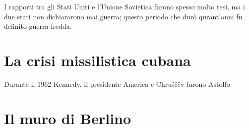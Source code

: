 I rapporti tra gli Stati Uniti e l'Unione Sovietica furono spesso molto tesi, ma i due stati non dichiararono mai guerra; questo periodo che durò qurant'anni fu definito guerra fredda.

\section{La crisi missilistica cubana}
Durante il 1962 Kennedy, il presidente America e Chruščëv furono Astolfo

\section{Il muro di Berlino}
